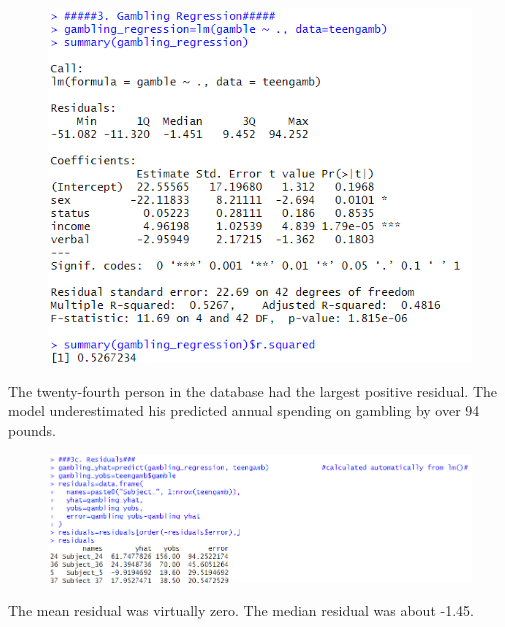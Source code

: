 \documentclass[12pt, letterpaper]{article}
\theoremstyle{definition}
\numberwithin{equation}{section}
\newcommand{\+}[1]{+_{\scalebox{.375}{#1}}}
\newcommand{\1}{\mathbbm{1}}
\begin{document}
\begin{figure}[H]
	\centering
	\includegraphics[width=12cm]{Gambling R Square}
\end{figure}


\vspace{\baselineskip}
\noindent\textbf{}
\vspace{-0.25cm}

The twenty-fourth person in the database had the largest positive residual. The model underestimated his predicted annual spending on gambling by over 94 pounds.

\begin{figure}[H]
	\centering
	\includegraphics[width=14cm]{Gambling Residual}
\end{figure}


\vspace{\baselineskip}
\noindent\textbf{}
\vspace{\baselineskip}

The mean residual was virtually zero. The median residual was about -1.45.
\end{document}
